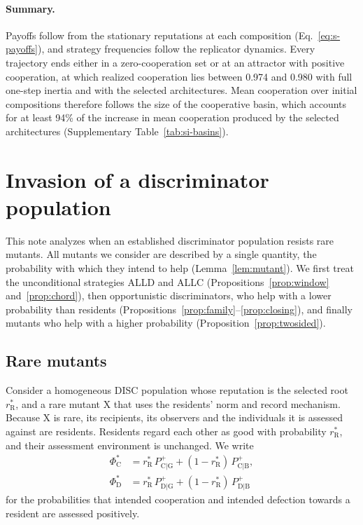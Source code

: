\documentclass[10pt]{wlscirep}
\newcommand{\Pp}[1]{P^{+}_{\mathrm{#1}}}   %
\newcommand{\rR}{r_{\mathrm{R}}^{*}}
\newcommand{\PhiCs}{\Phi^{*}_{\mathrm{C}}}
\newcommand{\PhiDs}{\Phi^{*}_{\mathrm{D}}}
\theoremstyle{plain}
\theoremstyle{remark}
\begin{document}
\paragraph{Summary.} Payoffs follow from the stationary reputations at each composition (Eq.~\eqref{eq:s-payoffs}), and strategy frequencies follow the replicator dynamics. Every trajectory ends either in a zero-cooperation set or at an attractor with positive cooperation, at which realized cooperation lies between 0.974 and 0.980 with full one-step inertia and with the selected architectures. Mean cooperation over initial compositions therefore follows the size of the cooperative basin, which accounts for at least 94\% of the increase in mean cooperation produced by the selected architectures (Supplementary Table~\ref{tab:si-basins}).

\FloatBarrier
\section{Invasion of a discriminator population}
\label{si:invasion}

This note analyzes when an established discriminator population resists rare mutants. All mutants we consider are described by a single quantity, the probability with which they intend to help (Lemma~\ref{lem:mutant}). We first treat the unconditional strategies ALLD and ALLC (Propositions~\ref{prop:window} and~\ref{prop:chord}), then opportunistic discriminators, who help with a lower probability than residents (Propositions~\ref{prop:family}--\ref{prop:closing}), and finally mutants who help with a higher probability (Proposition~\ref{prop:twosided}).

\subsection{Rare mutants}
\label{si:mutant}

Consider a homogeneous DISC population whose reputation is the selected root $\rR$, and a rare mutant X that uses the residents' norm and record mechanism. Because X is rare, its recipients, its observers and the individuals it is assessed against are residents. Residents regard each other as good with probability $\rR$, and their assessment environment is unchanged. We write
\begin{equation}
\begin{aligned}
\PhiCs&=\rR\,\Pp{C|G}+(1-\rR)\,\Pp{C|B},\\
\PhiDs&=\rR\,\Pp{D|G}+(1-\rR)\,\Pp{D|B}
\end{aligned}
\label{eq:s-phistar}
\end{equation}
for the probabilities that intended cooperation and intended defection towards a resident are assessed positively.
\end{document}
